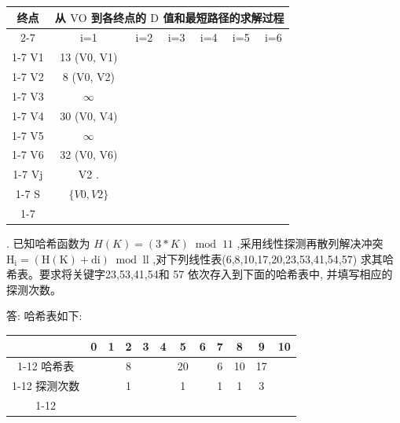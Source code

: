 \begin{center}
\begin{tabular}{|c|c|c|c|c|c|c|}
\hline
\multirow{2}{*}{终点} & \multicolumn{6}{|c|}{从 \(\mathrm{{VO}}\) 到各终点的 \(\mathrm{D}\) 值和最短路径的求解过程} \\
\cline{2-7}
 & i=1 & i=2 & i=3 & i=4 & i=5 & i=6 \\
\cline{1-7}
V1 & 13 (V0, V1) & \phantom{X} & \phantom{X} & \phantom{X} & \phantom{X} & \phantom{X} \\
\cline{1-7}
V2 & 8 (V0, V2) & \phantom{X} & \phantom{X} & \phantom{X} & \phantom{X} & \phantom{X} \\
\cline{1-7}
V3 & \(\infty\) & \phantom{X} & \phantom{X} & \phantom{X} & \phantom{X} & \phantom{X} \\
\cline{1-7}
V4 & 30 (V0, V4) & \phantom{X} & \phantom{X} & \phantom{X} & \phantom{X} & \phantom{X} \\
\cline{1-7}
V5 & \(\infty\) & \phantom{X} & \phantom{X} & \phantom{X} & \phantom{X} & \phantom{X} \\
\cline{1-7}
V6 & 32 (V0, V6) & \phantom{X} & \phantom{X} & \phantom{X} & \phantom{X} & \phantom{X} \\
\cline{1-7}
Vj & V2 . & \phantom{X} & \phantom{X} & \phantom{X} & \phantom{X} & \phantom{X} \\
\cline{1-7}
S & \(\{ {V0},{V2}\}\) & \phantom{X} & \phantom{X} & \phantom{X} & \phantom{X} & \phantom{X} \\
\cline{1-7}
\hline
\end{tabular}
\end{center}
\vspace{3em}

. 已知哈希函数为 \(H\left( K\right)  = \left( {3 * K}\right) {\;\operatorname{mod}\;{11}}\) ,采用线性探测再散列解决冲突 \({\mathrm{H}}_{\mathrm{i}} = \left( {\mathrm{H}\left( \mathrm{K}\right)  + \mathrm{{di}}}\right) {\;\operatorname{mod}\;\mathrm{{ll}}}\) ,对下列线性表(6,8,10,17,20,23,53,41,54,57) 求其哈希表。要求将关键字23,53,41,54和 57 依次存入到下面的哈希表中, 并填写相应的探测次数。

答: 哈希表如下:

\begin{center}
\begin{tabular}{|c|c|c|c|c|c|c|c|c|c|c|c|}
\hline
\phantom{X} & 0 & 1 & 2 & 3 & 4 & 5 & 6 & 7 & 8 & 9 & 10 \\
\cline{1-12}
哈希表 & \phantom{X} & \phantom{X} & 8 & \phantom{X} & \phantom{X} & 20 & \phantom{X} & 6 & 10 & 17 & \phantom{X} \\
\cline{1-12}
探测次数 & \phantom{X} & \phantom{X} & 1 & \phantom{X} & \phantom{X} & 1 & \phantom{X} & 1 & 1 & 3 & \phantom{X} \\
\cline{1-12}
\hline
\end{tabular}
\end{center}

